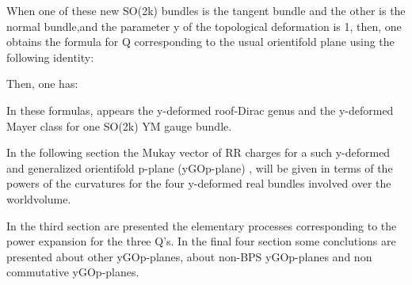 \documentclass[a4paper,a4paper]{article}
\begin{document}
\begin{center}
{  \coordHE{} }
\end{center}

When one of these new SO(2k) bundles is the tangent bundle and the other is the normal bundle,and the parameter y of the topological deformation is 1, then, one obtains the  formula for Q corresponding to the usual orientifold plane using the following identity:
\begin{center}

 
{  \coordHE{}}
\end{center}

Then, one has:

\begin{center}
{  \coordHE{} }
\end{center}

\begin{center}
{  \coordHE{} }
\end{center}

In these formulas, appears the y-deformed roof-Dirac genus and  the y-deformed  Mayer class for one SO(2k) YM gauge bundle.

    
In the following section the Mukay vector of RR charges for a such y-deformed and generalized orientifold p-plane (yGOp-plane) , will be given in terms of the powers of the curvatures for the four y-deformed real bundles involved over the worldvolume.


 




 In the third section are presented the elementary processes corresponding to the power expansion for the three Q's. In the final four section some conclutions are presented about other yGOp-planes, about non-BPS yGOp-planes and non commutative yGOp-planes.
\end{document}
